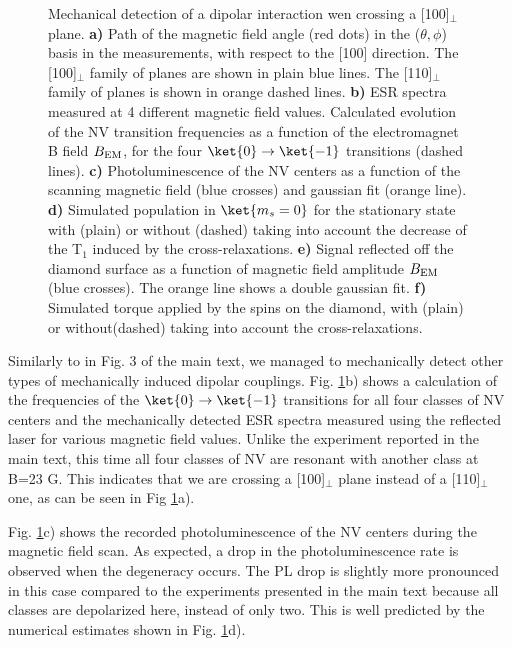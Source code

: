 \documentclass[preprintnumbers,amsmath,amssymb,onecolumn,12pt]{revtex4}
\begin{document}
\begin{figure}[!ht]
  \centering {}
  \caption{Mechanical detection of a dipolar interaction wen crossing a [100]$_\perp$ plane. \textbf{a)} Path of the magnetic field angle (red dots) in the ($\theta , \phi$) basis in the measurements, with respect to the [100] direction. The [100]$_\perp$ family of planes are shown in plain blue lines. The [110]$_\perp$ family of planes is shown in orange dashed lines. \textbf{b)} ESR spectra measured at 4 different magnetic field values. Calculated evolution of the NV transition frequencies as a function of the electromagnet B field $B_{\rm EM}$, for the four $\ket{0} \to \ket{-1}$ transitions (dashed lines). \textbf{c)} Photoluminescence of the NV centers as a function of the scanning magnetic field (blue crosses) and gaussian fit (orange line). \textbf{d)} Simulated population in $\ket{m_s=0}$ for the stationary state with (plain) or without (dashed) taking into account the decrease of the T$_1$ induced by the cross-relaxations.
  \textbf{e)} Signal reflected off the diamond surface as a function of magnetic field amplitude $B_{\rm EM}$ (blue crosses). The orange line shows a double gaussian fit. \textbf{f)} Simulated torque applied by the spins on the diamond, with (plain) or without(dashed) taking into account the cross-relaxations.}
	\label{CR_22}
\end{figure}

Similarly to in Fig. 3 of the main text, we managed to mechanically detect other types of mechanically induced dipolar couplings.
Fig. \ref{CR_22}b) shows a calculation of the frequencies of the $\ket{0} \to \ket{-1}$ transitions for all four classes of NV centers and the mechanically detected ESR spectra measured using the reflected laser for various magnetic field values. Unlike the experiment reported in the main text, this time all four classes of NV are resonant with another class at B=23 G. This indicates that we are crossing a [100]$_\perp$ plane instead of a [110]$_\perp$ one, as can be seen in Fig \ref{CR_22}a).

Fig. \ref{CR_22}c) shows the recorded photoluminescence of the NV centers during the magnetic field scan. As expected, a drop in the photoluminescence rate is observed when the degeneracy occurs. The PL drop is slightly more pronounced in this case compared to the experiments presented in the main text because all classes are depolarized here, instead of only two. This is well predicted by the numerical estimates shown in Fig. \ref{CR_22}d).
\end{document}
